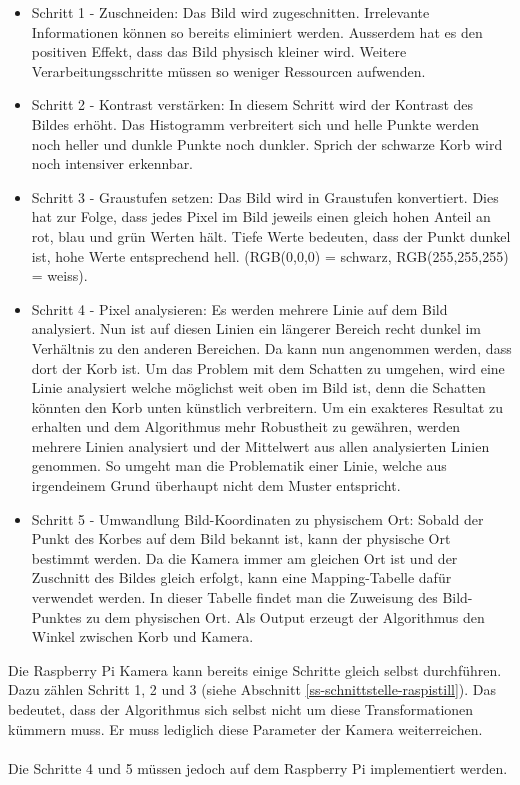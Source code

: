 \begin{itemize}
	\item Schritt 1 - Zuschneiden: Das Bild wird zugeschnitten. Irrelevante Informationen können so bereits eliminiert werden. Ausserdem hat es den positiven Effekt, dass das Bild physisch kleiner wird. Weitere Verarbeitungsschritte müssen so weniger Ressourcen aufwenden. 
	
	\item Schritt 2 - Kontrast verstärken: In diesem Schritt wird der Kontrast des Bildes erhöht. Das Histogramm verbreitert sich und helle Punkte werden noch heller und dunkle Punkte noch dunkler. Sprich der schwarze Korb wird noch intensiver erkennbar. 
	
	\item Schritt 3 - Graustufen setzen: Das Bild wird in Graustufen konvertiert. Dies hat zur Folge, dass jedes Pixel im Bild jeweils einen gleich hohen Anteil an rot, blau und grün Werten hält. Tiefe Werte bedeuten, dass der Punkt dunkel ist, hohe Werte entsprechend hell. (RGB(0,0,0) = schwarz, RGB(255,255,255) = weiss).
	
	\item Schritt 4 - Pixel analysieren: Es werden mehrere Linie auf dem Bild analysiert. Nun ist auf diesen Linien ein längerer Bereich recht dunkel im Verhältnis zu den anderen Bereichen. Da kann nun angenommen werden, dass dort der Korb ist. Um das Problem mit dem Schatten zu umgehen, wird eine Linie analysiert welche möglichst weit oben im Bild ist, denn die Schatten könnten den Korb unten künstlich verbreitern. Um ein exakteres Resultat zu erhalten und dem Algorithmus mehr Robustheit zu gewähren, werden mehrere Linien analysiert und der Mittelwert aus allen analysierten Linien genommen. So umgeht man die Problematik einer Linie, welche aus irgendeinem Grund überhaupt nicht dem Muster entspricht.
	
	\item Schritt 5 - Umwandlung Bild-Koordinaten zu physischem Ort: Sobald der Punkt des Korbes auf dem Bild bekannt ist, kann der physische Ort bestimmt werden. Da die Kamera immer am gleichen Ort ist und der Zuschnitt des Bildes gleich erfolgt, kann eine Mapping-Tabelle dafür verwendet werden. In dieser Tabelle findet man die Zuweisung des Bild-Punktes zu dem physischen Ort. Als Output erzeugt der Algorithmus den Winkel zwischen Korb und Kamera.
\end{itemize} 
Die Raspberry Pi Kamera kann bereits einige Schritte gleich selbst durchführen. Dazu zählen Schritt 1, 2 und 3 (siehe Abschnitt \ref{ss-schnittstelle-raspistill}). Das bedeutet, dass der Algorithmus sich selbst nicht um diese Transformationen kümmern muss. Er muss lediglich diese Parameter der Kamera weiterreichen.\\
\\
Die Schritte 4 und 5 müssen jedoch auf dem Raspberry Pi implementiert werden.

